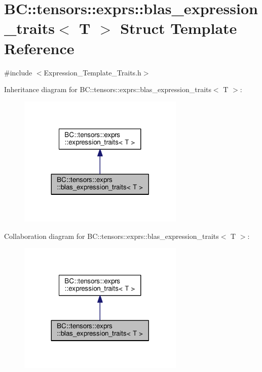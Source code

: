 \hypertarget{structBC_1_1tensors_1_1exprs_1_1blas__expression__traits}{}\section{BC\+:\+:tensors\+:\+:exprs\+:\+:blas\+\_\+expression\+\_\+traits$<$ T $>$ Struct Template Reference}
\label{structBC_1_1tensors_1_1exprs_1_1blas__expression__traits}


{\ttfamily \#include $<$Expression\+\_\+\+Template\+\_\+\+Traits.\+h$>$}



Inheritance diagram for BC\+:\+:tensors\+:\+:exprs\+:\+:blas\+\_\+expression\+\_\+traits$<$ T $>$\+:
\nopagebreak
\begin{figure}[H]
\begin{center}
\leavevmode
\includegraphics[width=224pt]{structBC_1_1tensors_1_1exprs_1_1blas__expression__traits__inherit__graph}
\end{center}
\end{figure}


Collaboration diagram for BC\+:\+:tensors\+:\+:exprs\+:\+:blas\+\_\+expression\+\_\+traits$<$ T $>$\+:
\nopagebreak
\begin{figure}[H]
\begin{center}
\leavevmode
\includegraphics[width=224pt]{structBC_1_1tensors_1_1exprs_1_1blas__expression__traits__coll__graph}
\end{center}
\end{figure}
